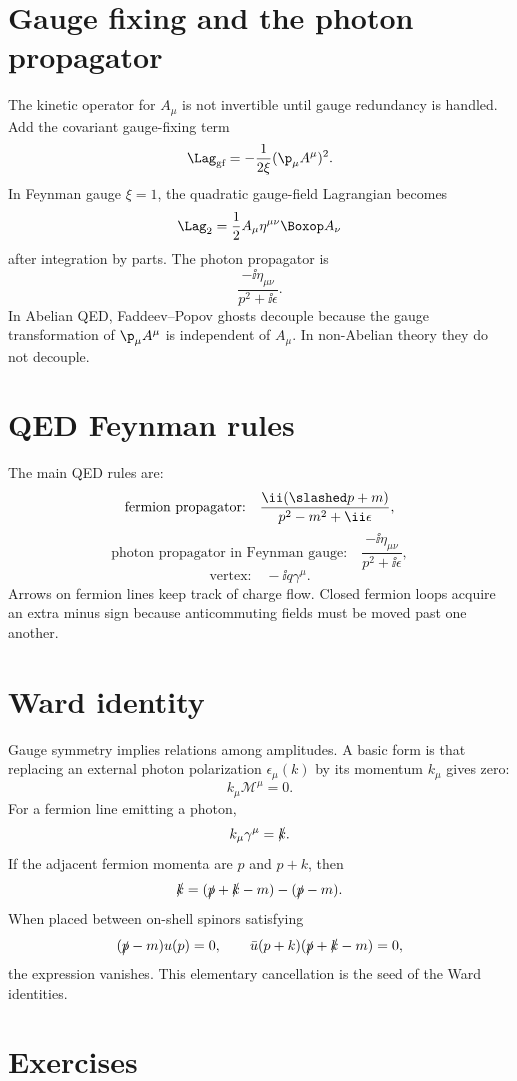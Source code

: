 \section{Gauge fixing and the photon propagator}

The kinetic operator for \(A_\mu\) is not invertible until gauge redundancy is handled.  Add the covariant gauge-fixing term
\[
  \Lag_{\text{gf}}=-\frac1{2\xi}(\p_\mu A^\mu)^2.
\]
In Feynman gauge \(\xi=1\), the quadratic gauge-field Lagrangian becomes
\[
  \Lag_2=\frac12 A_\mu \eta^{\mu\nu}\Boxop A_\nu
\]
after integration by parts.  The photon propagator is
\[
  \frac{-\ii\eta_{\mu\nu}}{p^2+\ii\epsilon}.
\]
In Abelian QED, Faddeev--Popov ghosts decouple because the gauge transformation of \(\p_\mu A^\mu\) is independent of \(A_\mu\).  In non-Abelian theory they do not decouple.

\section{QED Feynman rules}

The main QED rules are:
\[
  \text{fermion propagator:}\quad
  \frac{\ii(\slashed p+m)}{p^2-m^2+\ii\epsilon},
\]
\[
  \text{photon propagator in Feynman gauge:}\quad
  \frac{-\ii\eta_{\mu\nu}}{p^2+\ii\epsilon},
\]
\[
  \text{vertex:}\quad -\ii q\gamma^\mu.
\]
Arrows on fermion lines keep track of charge flow.  Closed fermion loops acquire an extra minus sign because anticommuting fields must be moved past one another.

\section{Ward identity}

Gauge symmetry implies relations among amplitudes.  A basic form is that replacing an external photon polarization \(\epsilon_\mu(k)\) by its momentum \(k_\mu\) gives zero:
\[
  k_\mu\mathcal M^\mu=0.
\]
For a fermion line emitting a photon,
\[
  k_\mu\gamma^\mu=\slashed k.
\]
If the adjacent fermion momenta are \(p\) and \(p+k\), then
\[
  \slashed k=(\slashed p+\slashed k-m)-(\slashed p-m).
\]
When placed between on-shell spinors satisfying
\[
  (\slashed p-m)u(p)=0,
  \qquad
  \bar u(p+k)(\slashed p+\slashed k-m)=0,
\]
the expression vanishes.  This elementary cancellation is the seed of the Ward identities.

\section*{Exercises}

